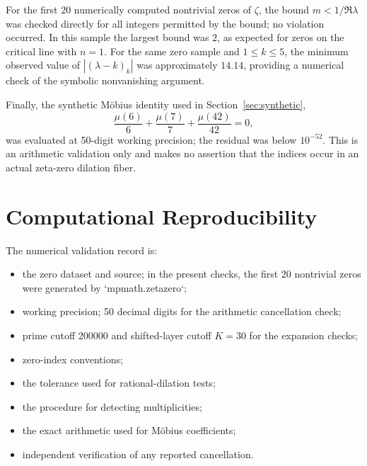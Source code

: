 \documentclass[11pt]{article}
\theoremstyle{definition}
\begin{document}
For the first $20$ numerically computed nontrivial zeros of $\zeta$, the bound
$m<1/\Re\lambda$ was checked directly for all integers permitted by the bound;
no violation occurred. In this sample the largest bound was $2$, as expected for
zeros on the critical line with $n=1$. For the same zero sample and
$1\leq k\leq5$, the minimum observed value of
$|(\lambda-k)_k|$ was approximately $14.14$, providing a numerical check of the
symbolic nonvanishing argument.

Finally, the synthetic Möbius identity used in Section~\ref{sec:synthetic},
\[
\frac{\mu(6)}6+\frac{\mu(7)}7+\frac{\mu(42)}{42}=0,
\]
was evaluated at 50-digit working precision; the residual was below
$10^{-52}$. This is an arithmetic validation only and makes no assertion that the
indices occur in an actual zeta-zero dilation fiber.

\section{Computational Reproducibility}

The numerical validation record is:
\begin{itemize}[nosep]
\item the zero dataset and source; in the present checks, the first 20 nontrivial zeros were generated by `mpmath.zetazero`;
\item working precision; 50 decimal digits for the arithmetic cancellation check;
\item prime cutoff $200000$ and shifted-layer cutoff $K=30$ for the expansion checks;
\item zero-index conventions;
\item the tolerance used for rational-dilation tests;
\item the procedure for detecting multiplicities;
\item the exact arithmetic used for Möbius coefficients;
\item independent verification of any reported cancellation.
\end{itemize}
\end{document}
